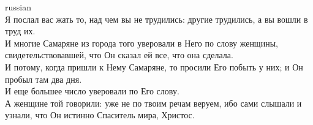 \documentclass[10pt]{article} %
\begin{document}
{\begin{minipage}[t]{0.46\textwidth}
\begin{otherlanguage*}{russian}
\\
Я послал вас жать то, над чем вы не трудились: другие трудились, а вы вошли в труд их.
\\
И многие Самаряне из города того уверовали в Него по слову женщины, свидетельствовавшей, что Он сказал ей все, что она сделала.
\\
И потому, когда пришли к Нему Самаряне, то просили Его побыть у них; и Он пробыл там два дня.
\\
И еще большее число уверовали по Его слову.
\\
А женщине той говорили: уже не по твоим речам веруем, ибо сами слышали и узнали, что Он истинно Спаситель мира, Христос.
\\

\end{otherlanguage*}
\end{minipage}
\hfill
\begin{minipage}[t]{0.46\textwidth}


\end{minipage}}
\end{document}
